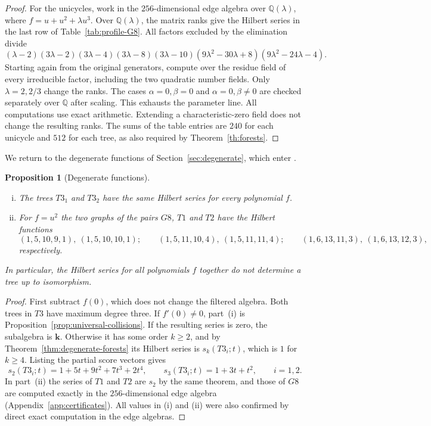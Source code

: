 \documentclass[reqno]{article}
\theoremstyle{plain} %
\newtheorem{proposition}[theorem]{Proposition}
\theoremstyle{definition}
\theoremstyle{remark}
\newcommand{\K} {\mathbf{k}}
\numberwithin{equation}{section}
\begin{document}
\begin{proof}
For the unicycles, work in the $256$-dimensional edge algebra over
$\mathbb{Q}(\lambda)$, where $f=u+u^2+\lambda u^3$.
Over $\mathbb{Q}(\lambda)$, the matrix ranks give the Hilbert series
in the last row of Table~\ref{tab:profile-G8}. All factors excluded by
the elimination divide
\begin{equation}\label{eq:G8-pivot-polynomial}
(\lambda-2)(3\lambda-2)(3\lambda-4)(3\lambda-8)(3\lambda-10)
(9\lambda^2-30\lambda+8) (9\lambda^2-24\lambda-4).
\end{equation}
Starting again from the original generators, compute over the residue
field of every irreducible factor, including the two quadratic number
fields. Only $\lambda=2,2/3$ change the ranks. The cases
$\alpha=0,\beta=0$ and $\alpha=0,\beta\ne0$ are checked separately
over $\mathbb{Q}$ after scaling. This exhausts the parameter line.
All computations use exact arithmetic. Extending a  characteristic-zero field does not change the resulting ranks. The sums of the table entries are
$240$ for each unicycle and $512$ for each tree, as also required by
Theorem~\ref{th:forests}.
\end{proof}

We return to the degenerate functions of Section~\ref{sec:degenerate},
which enter \cite[Problem~5]{NSh}.

\begin{proposition}[Degenerate functions]\label{prop:degenerate-collisions}
\leavevmode
\begin{enumerate}[(i)]
\item The trees $T3_1$ and $T3_2$ have the same Hilbert series for every
polynomial $f$.
\item For $f=u^2$ the two graphs of the pairs $G8$, $T1$ and $T2$ have the
Hilbert functions
\[
(1,5,10,9,1),\ (1,5,10,10,1);\qquad
(1,5,11,10,4),\ (1,5,11,11,4);\qquad
(1,6,13,11,3),\ (1,6,13,12,3),
\]
respectively.
\end{enumerate}
In particular, the Hilbert series for all polynomials $f$ together do not
determine a tree up to isomorphism.
\end{proposition}
\begin{proof}
First subtract $f(0)$, which does not change the filtered algebra.
Both trees in $T3$ have maximum degree three. If $f'(0)\ne0$, part~(i)
is Proposition~\ref{prop:universal-collisions}. If the resulting series
is zero, the subalgebra is $\K$. Otherwise it has some order $k\ge2$, and by
Theorem~\ref{thm:degenerate-forests} its Hilbert series is $s_k(T3_i;t)$,
which is $1$ for $k\ge4$. Listing the partial score vectors gives
\[
 s_2(T3_i;t)=1+5t+9t^2+7t^3+2t^4,\qquad s_3(T3_i;t)=1+3t+t^2,
 \qquad i=1,2.
\]
In part~(ii) the series of $T1$ and $T2$ are $s_2$ by the same theorem,
and those of $G8$ are computed exactly in the $256$-dimensional edge
algebra (Appendix~\ref{app:certificates}). All values in (i) and (ii)
were also confirmed by direct exact computation in the edge algebras.
\end{proof}
\end{document}
